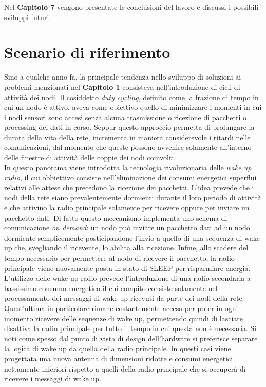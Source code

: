 \documentclass[binding=0.6cm,TFA]{sapthesis}
\begin{document}
Nel \textbf{Capitolo 7} vengono presentate le conclusioni del lavoro e discussi i possibili sviluppi futuri.

\let\cleardoublepage    %
\clearpage
\let\cleardoublepage\clearpage  %

\chapter{Scenario di riferimento}

Sino a qualche anno fa, la principale tendenza nello sviluppo di soluzioni ai problemi menzionati nel \textbf{Capitolo 1} consisteva nell'introduzione di cicli di attività
dei nodi. Il cosiddetto \emph{duty cycling}, definito come la frazione di tempo in cui un nodo è attivo, aveva come obiettivo quello di minimizzare i momenti
in cui i nodi sensori sono accesi senza alcuna trasmissione o ricezione di pacchetti o processing dei dati in corso. Seppur questo approccio permetta di prolungare la durata della vita della rete,
incrementa in maniera considerevole i ritardi nelle comunicazioni, dal momento che queste possono avvenire solamente all'interno delle finestre di attività
delle coppie dei nodi coinvolti.\\

In questo panorama viene introdotta la tecnologia rivoluzionaria delle \emph{wake up radio}, il cui obbiettivo consiste nell'eliminazione dei consumi energetici
superflui relativi alle attese che precedono la ricezione dei pacchetti. L'idea prevede che i nodi della rete siano prevalentemente dormienti durante il loro
periodo di attività e che attivino la radio principale solamente per ricevere oppure per inviare un pacchetto dati. Di fatto questo meccanismo implementa uno
schema di comunicazione \emph{on demand}: un nodo può inviare un pacchetto dati ad un nodo dormiente semplicemente posticipandone l'invio a quello di una
sequenza di wake-up che, svegliando il ricevente, lo abilita alla ricezione. Infine, allo scadere del tempo necessario per permettere al nodo di ricevere il
pacchetto, la radio principale viene nuovamente posta in stato di SLEEP per risparmiare energia.\\

L'utilizzo delle wake up radio prevede l'introduzione di una radio secondaria a bassissimo consumo energetico il cui compito consiste solamente nel processamento dei messaggi di wake up ricevuti
da parte dei nodi della rete. Quest'ultima in particolare rimane costantemente accesa per poter in ogni momento ricevere delle sequenze di wake up, permettendo
quindi di lasciare disattiva la radio principale per tutto il tempo in cui questa non è necessaria. Si noti come spesso dal punto di vista di design
dell'hardware si preferisce separare la logica di wake up da quella della radio principale. In questi casi viene progettata una nuova antenna di dimensioni
ridotte e consumi energetici nettamente inferiori rispetto a quelli della radio principale che si occuperà di ricevere i messaggi di wake up.\\
\end{document}
